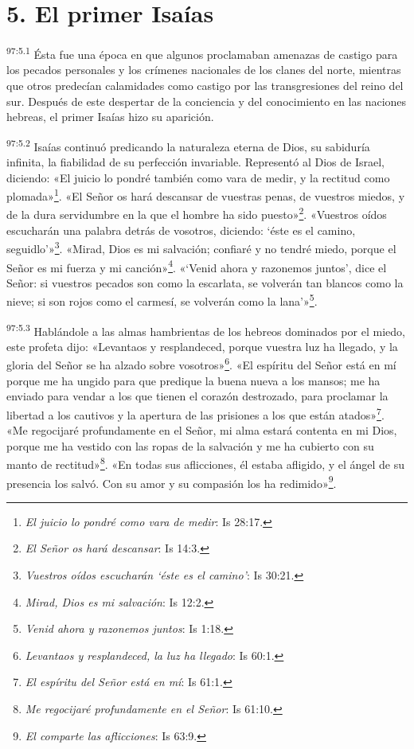 \section*{5. El primer Isaías}
\par
\textsuperscript{97:5.1} Ésta fue una época en que algunos proclamaban amenazas de castigo para los pecados personales y los crímenes nacionales de los clanes del norte, mientras que otros predecían calamidades como castigo por las transgresiones del reino del sur. Después de este despertar de la conciencia y del conocimiento en las naciones hebreas, el primer Isaías hizo su aparición.

\par
\textsuperscript{97:5.2} Isaías continuó predicando la naturaleza eterna de Dios, su sabiduría infinita, la fiabilidad de su perfección invariable. Representó al Dios de Israel, diciendo: «El juicio lo pondré también como vara de medir, y la rectitud como plomada»\footnote{\textit{El juicio lo pondré como vara de medir}: Is 28:17.}. «El Señor os hará descansar de vuestras penas, de vuestros miedos, y de la dura servidumbre en la que el hombre ha sido puesto»\footnote{\textit{El Señor os hará descansar}: Is 14:3.}. «Vuestros oídos escucharán una palabra detrás de vosotros, diciendo: `éste es el camino, seguidlo'»\footnote{\textit{Vuestros oídos escucharán `éste es el camino'}: Is 30:21.}. «Mirad, Dios es mi salvación; confiaré y no tendré miedo, porque el Señor es mi fuerza y mi canción»\footnote{\textit{Mirad, Dios es mi salvación}: Is 12:2.}. «`Venid ahora y razonemos juntos', dice el Señor: si vuestros pecados son como la escarlata, se volverán tan blancos como la nieve; si son rojos como el carmesí, se volverán como la lana'»\footnote{\textit{Venid ahora y razonemos juntos}: Is 1:18.}.

\par
\textsuperscript{97:5.3} Hablándole a las almas hambrientas de los hebreos dominados por el miedo, este profeta dijo: «Levantaos y resplandeced, porque vuestra luz ha llegado, y la gloria del Señor se ha alzado sobre vosotros»\footnote{\textit{Levantaos y resplandeced, la luz ha llegado}: Is 60:1.}. «El espíritu del Señor está en mí porque me ha ungido para que predique la buena nueva a los mansos; me ha enviado para vendar a los que tienen el corazón destrozado, para proclamar la libertad a los cautivos y la apertura de las prisiones a los que están atados»\footnote{\textit{El espíritu del Señor está en mí}: Is 61:1.}. «Me regocijaré profundamente en el Señor, mi alma estará contenta en mi Dios, porque me ha vestido con las ropas de la salvación y me ha cubierto con su manto de rectitud»\footnote{\textit{Me regocijaré profundamente en el Señor}: Is 61:10.}. «En todas sus aflicciones, él estaba afligido, y el ángel de su presencia los salvó. Con su amor y su compasión los ha redimido»\footnote{\textit{El comparte las aflicciones}: Is 63:9.}.

